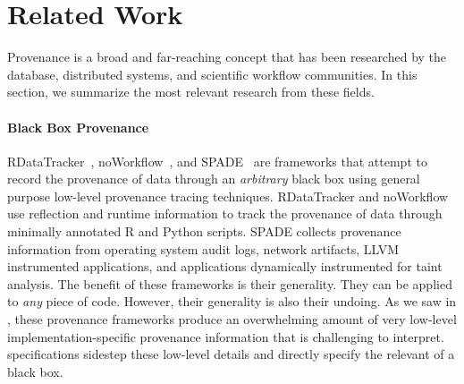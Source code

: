\section{Related Work}
%
%
Provenance is a broad and far-reaching concept that has been researched by the
database, distributed systems, and scientific workflow communities. In this
section, we summarize the most relevant research from these fields.

\paragraph{Black Box Provenance}
RDataTracker~\cite{lerner2014collecting},
noWorkflow~\cite{murta2014noworkflow}, and SPADE~\cite{gehani2012spade} are
frameworks that attempt to record the provenance of data through an
\emph{arbitrary} black box using general purpose low-level provenance tracing
techniques. RDataTracker and noWorkflow use reflection and runtime information
to track the provenance of data through minimally annotated R and Python
scripts. SPADE collects provenance information from operating system audit
logs, network artifacts, LLVM instrumented applications, and applications
dynamically instrumented for taint analysis. The benefit of these frameworks is
their generality. They can be applied to \emph{any} piece of code. However,
their generality is also their undoing. As we saw in , these
provenance frameworks produce an overwhelming amount of very low-level
implementation-specific provenance information that is challenging to
interpret. \watprovenance{} specifications sidestep these low-level details and
directly specify the relevant \watprovenance{} of a black box.

